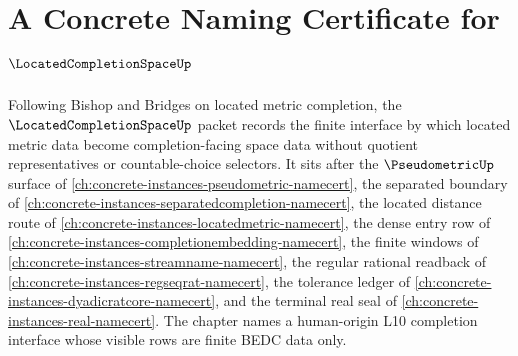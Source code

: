 \chapter{A Concrete Naming Certificate for $\LocatedCompletionSpaceUp$}
\label{ch:concrete-instances-located-completion-space-namecert}

Following Bishop and Bridges on located metric completion, the $\LocatedCompletionSpaceUp$ packet records the finite interface by which located metric data become completion-facing space data without quotient representatives or countable-choice selectors. It sits after the $\PseudometricUp$ surface of \autoref{ch:concrete-instances-pseudometric-namecert}, the separated boundary of \autoref{ch:concrete-instances-separatedcompletion-namecert}, the located distance route of \autoref{ch:concrete-instances-locatedmetric-namecert}, the dense entry row of \autoref{ch:concrete-instances-completionembedding-namecert}, the finite windows of \autoref{ch:concrete-instances-streamname-namecert}, the regular rational readback of \autoref{ch:concrete-instances-regseqrat-namecert}, the tolerance ledger of \autoref{ch:concrete-instances-dyadicratcore-namecert}, and the terminal real seal of \autoref{ch:concrete-instances-real-namecert}. The chapter names a human-origin L10 completion interface whose visible rows are finite BEDC data only.

